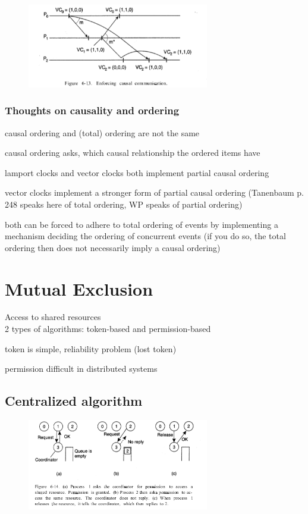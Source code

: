 \documentclass[ngerman,a4paper]{report}
\begin{document}
\begin{figure}[h]
	\centering
	\includegraphics[width=300px]{gfx/vector-clock.png}
	\label{img:vector-clock}
\end{figure}

\subsection{Thoughts on causality and ordering}
\begin{compactitem}
\item causal ordering and (total) ordering are not the same
\item causal ordering asks, which causal relationship the ordered items have
\item lamport clocks and vector clocks both implement partial causal ordering
\item vector clocks implement a stronger form of partial causal ordering (Tanenbaum p. 248 speaks here of total ordering, WP speaks of partial ordering)
\item both can be forced to adhere to total ordering of events by implementing a mechanism deciding the ordering of concurrent events (if you do so, the total ordering then does not necessarily imply a causal ordering)
\end{compactitem}

\chapter{Mutual Exclusion}
Access to shared resources\\
2 types of algorithms: token-based and permission-based
\begin{compactitem}
	\item token is simple, reliability problem (lost token)
	\item permission difficult in distributed systems
\end{compactitem}

\section{Centralized algorithm}
\begin{figure}[h]
	\centering
	\includegraphics[width=300px]{gfx/mutex-centralized.png}
	\label{img:mutex-centralized}
\end{figure}
\end{document}
